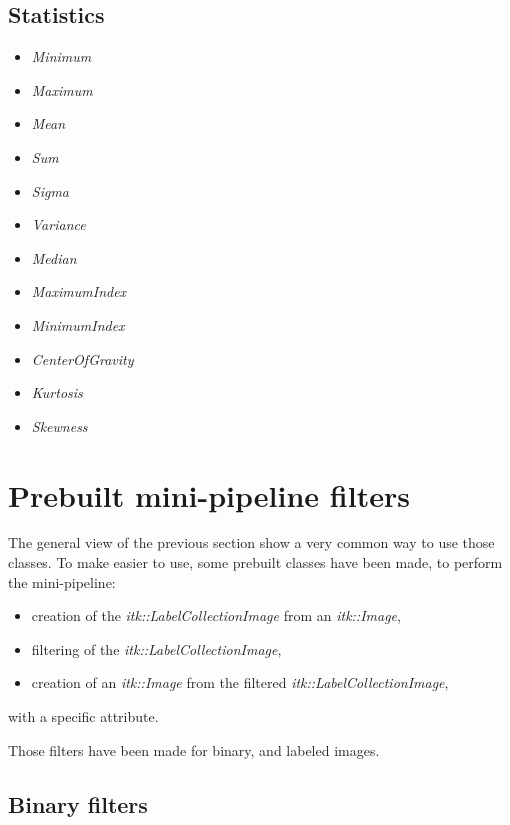 \documentclass{InsightArticle}
\begin{document}
\subsection{Statistics}

\begin{itemize}
  \item {\em Minimum}
  \item {\em Maximum}
  \item {\em Mean}
  \item {\em Sum}
  \item {\em Sigma}
  \item {\em Variance}
  \item {\em Median}
  \item {\em MaximumIndex}
  \item {\em MinimumIndex}
  \item {\em CenterOfGravity}
  \item {\em Kurtosis}
  \item {\em Skewness}
\end{itemize}

\section{Prebuilt mini-pipeline filters}

The general view of the previous section show a very common way to use those
classes. To make easier to use, some prebuilt classes have been made, to perform
the mini-pipeline:
\begin{itemize}
  \item creation of the {\em itk::LabelCollectionImage} from an {\em
itk::Image},
  \item filtering of the {\em itk::LabelCollectionImage},
  \item creation of an {\em itk::Image} from the filtered {\em
itk::LabelCollectionImage},
\end{itemize}
with a specific attribute.

Those filters have been made for binary, and labeled images.

\subsection{Binary filters}
\end{document}
